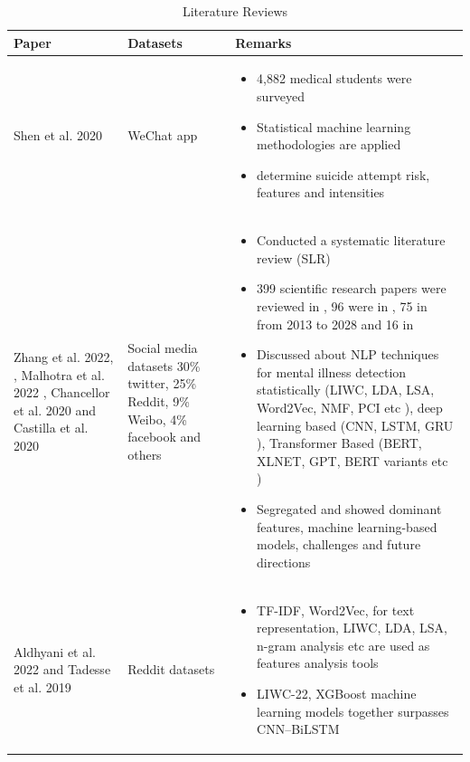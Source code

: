 \documentclass[sn-mathphys,Numbered]{sn-jnl}%
\theoremstyle{thmstyleone}%
\theoremstyle{thmstyletwo}%
\theoremstyle{thmstylethree}%
\begin{document}
\begin{table}[h!]
\begin{center}
\begin{flushleft}
\caption{Literature Reviews}\label{chord_inference}%
\begin{tabular}{|p{2cm}|p{2cm}|p{8cm}|}
\toprule
\textbf{Paper} & \textbf{Datasets} & \textbf{Remarks} \\
\midrule
Shen et al. 2020 \cite{shen2020detecting} & 
WeChat app &
\begin{itemize}
\item 4,882 medical students were surveyed
\item Statistical machine learning methodologies are applied
\item determine suicide attempt risk, features and intensities
\end{itemize} 
\\
Zhang et al. 2022, \cite{zhang2022natural}, Malhotra et al. 2022 \cite{malhotra2022deep}, Chancellor et al. 2020 \cite{chancellor2020methods} and Castilla et al. 2020 \cite{castillo2020suicide}  & Social media datasets
30\% twitter, 25\% Reddit, 9\% Weibo, 4\% facebook and others
&
\begin{itemize}
\item Conducted a systematic literature review (SLR)
\item 399 scientific research papers were reviewed in  \cite{zhang2022natural}, 96 were in \cite{malhotra2022deep}, 75 in \cite{chancellor2020methods} from 2013 to 2028 and 16 in  \cite{castillo2020suicide} 
\item Discussed about NLP techniques for mental illness detection statistically (LIWC, LDA, LSA, Word2Vec, NMF, PCI etc \cite{zhang2022natural, castillo2020suicide, tadesse2019detection, pennebaker2001linguistic}), deep learning based (CNN, LSTM, GRU \cite{zhang2022natural}), Transformer Based (BERT, XLNET, GPT, BERT variants etc \cite{zhang2022natural})
\item Segregated and showed dominant features, machine learning-based models, challenges and future directions
\end{itemize}
\\ 
Aldhyani et al. 2022 \cite{aldhyani2022detecting} and Tadesse et al. 2019 \cite{tadesse2019detection}&
Reddit datasets &
\begin{itemize}
\item TF-IDF, Word2Vec, for text representation, LIWC, LDA, LSA, n-gram analysis etc are used as features analysis tools \cite{aldhyani2022detecting, tadesse2019detection}
\item LIWC-22, XGBoost machine learning models together surpasses CNN–BiLSTM \cite{aldhyani2022detecting}
\end{itemize}
\\


\end{tabular}
\end{flushleft}
\end{center}
\end{table}
\end{document}
